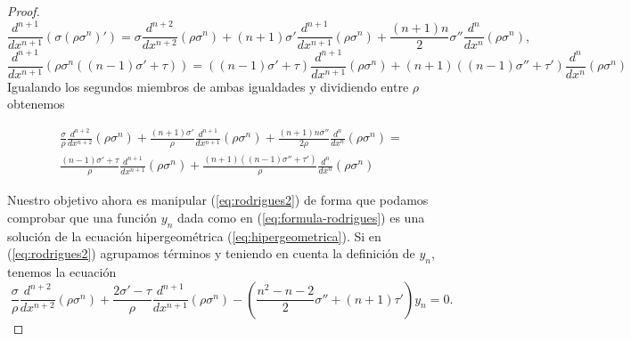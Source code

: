 \begin{proof}
    $$
    \frac{d^{n+1}}{d x^{n+1}}\left(\sigma(\rho \sigma^n)'\right)= \sigma \frac{d^{n+2}}{d x^{n+2}} \left(\rho\sigma^n\right) + (n+1)\sigma'\frac{d^{n+1}}{d x^{n+1}} \left(\rho\sigma^n \right) + \frac{(n+1)n}{2}\sigma''\frac{d^{n}}{d x^{n}} \left(\rho\sigma^n \right),
    $$
    $$
    \frac{d^{n+1}}{d x^{n+1}}\left(\rho \sigma^n ((n-1)\sigma'+\tau)\right) = ((n-1)\sigma'+\tau)\frac{d^{n+1}}{d x^{n+1}}\left(\rho\sigma^n \right) + (n+1)\left((n-1)\sigma'' + \tau'\right)\frac{d^{n}}{d x^{n}}\left(\rho\sigma^n \right)
    $$
    Igualando los segundos miembros de ambas igualdades y dividiendo entre $\rho$ obtenemos

    \begin{multline}
        \label{eq:rodrigues2}
        \frac{\sigma}{\rho} \frac{d^{n+2}}{d x^{n+2}} \left(\rho\sigma^n\right) + \frac{(n+1)\sigma'}{\rho}\frac{d^{n+1}}{d x^{n+1}} \left(\rho\sigma^n \right) + \frac{(n+1)n\sigma''}{2\rho}\frac{d^{n}}{d x^{n}} \left(\rho\sigma^n \right) =\\  \frac{(n-1)\sigma'+\tau}{\rho}\frac{d^{n+1}}{d x^{n+1}}\left(\rho\sigma^n \right) + \frac{(n+1)\left((n-1)\sigma'' + \tau'\right)}{\rho}\frac{d^{n}}{d x^{n}}\left(\rho\sigma^n \right)
    \end{multline}
    
    Nuestro objetivo ahora es manipular (\ref{eq:rodrigues2}) de forma que podamos comprobar que una función $y_n$ dada como en (\ref{eq:formula-rodrigues}) es una solución de la ecuación hipergeométrica (\ref{eq:hipergeometrica}). Si en (\ref{eq:rodrigues2}) agrupamos términos y teniendo en cuenta la definición de $y_n$, tenemos la ecuación
    \begin{equation}
        \label{eq:rodrigues3}
        \frac{\sigma}{\rho} \frac{d^{n+2}}{d x^{n+2}} \left(\rho\sigma^n\right) + \frac{2\sigma'-\tau}{\rho} \frac{d^{n+1}}{d x^{n+1}} \left(\rho\sigma^n \right) - \left(\frac{n^2-n-2}{2}\sigma'' + (n+1)\tau'\right)y_n =0.
    \end{equation}


\end{proof}
